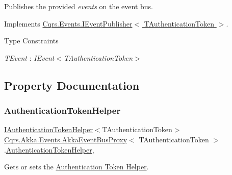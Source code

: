 Publishes the provided {\itshape events}  on the event bus. 



Implements \hyperlink{interfaceCqrs_1_1Events_1_1IEventPublisher_a2cbcc3d2c24d015abef6337714ec51ff_a2cbcc3d2c24d015abef6337714ec51ff}{Cqrs.\+Events.\+I\+Event\+Publisher$<$ T\+Authentication\+Token $>$}.

\begin{Desc}
\item[Type Constraints]\begin{description}
\item[{\em T\+Event} : {\em I\+Event$<$T\+Authentication\+Token$>$}]\end{description}
\end{Desc}


\subsection{Property Documentation}
\mbox{\label{classCqrs_1_1Akka_1_1Events_1_1AkkaEventBusProxy_a54964db320ef21b0564e66e9f258f694_a54964db320ef21b0564e66e9f258f694}} 
\subsubsection{\texorpdfstring{Authentication\+Token\+Helper}{AuthenticationTokenHelper}}
{\footnotesize\ttfamily \hyperlink{interfaceCqrs_1_1Authentication_1_1IAuthenticationTokenHelper}{I\+Authentication\+Token\+Helper}$<$T\+Authentication\+Token$>$ \hyperlink{classCqrs_1_1Akka_1_1Events_1_1AkkaEventBusProxy}{Cqrs.\+Akka.\+Events.\+Akka\+Event\+Bus\+Proxy}$<$ T\+Authentication\+Token $>$.\hyperlink{classCqrs_1_1Authentication_1_1AuthenticationTokenHelper}{Authentication\+Token\+Helper}\hspace{0.3cm}{\ttfamily [get]}, {\ttfamily [protected]}}



Gets or sets the \hyperlink{}{Authentication Token Helper}. 

\mbox{\label{classCqrs_1_1Akka_1_1Events_1_1AkkaEventBusProxy_a4cc4ec0ece94393246b0c64f02d55f41_a4cc4ec0ece94393246b0c64f02d55f41}} 

